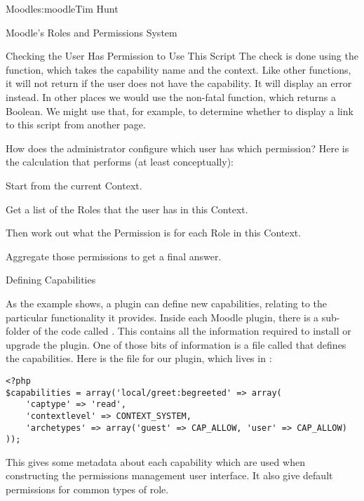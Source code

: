 \begin{aosachapter}{Moodle}{s:moodle}{Tim Hunt}
\begin{aosasect1}{Moodle's Roles and Permissions System}
\begin{aosasect2}{Checking the User Has Permission to Use This Script}
The check is done using the  function, which
takes the capability name and the context. Like other
 functions, it will not return if the user
does not have the capability. It will display an error instead. In
other places we would use the non-fatal 
function, which returns a Boolean. We might use that, for example, to
determine whether to display a link to this script from another page.

How does the administrator configure which user has which permission?
Here is the calculation that  performs (at least
conceptually):

\begin{aosaenumerate}

\item Start from the current Context.

\item Get a list of the Roles that the user has in this Context.

\item Then work out what the Permission is for each Role in this
  Context.

\item Aggregate those permissions to get a final answer.

\end{aosaenumerate}

\end{aosasect2}

\begin{aosasect2}{Defining Capabilities}

As the example shows, a plugin can define new capabilities, relating
to the particular functionality it provides. Inside each Moodle
plugin, there is a sub-folder of the code called . This
contains all the information required to install or upgrade the
plugin. One of those bits of information is a file called
 that defines the capabilities. Here is the
 file for our plugin, which lives in
:

\begin{verbatim}
<?php
$capabilities = array('local/greet:begreeted' => array(
    'captype' => 'read',
    'contextlevel' => CONTEXT_SYSTEM,
    'archetypes' => array('guest' => CAP_ALLOW, 'user' => CAP_ALLOW)
));
\end{verbatim}

This gives some metadata about each capability which are used when
constructing the permissions management user interface. It also give
default permissions for common types of role.


\end{aosasect2}
\end{aosasect1}
\end{aosachapter}
